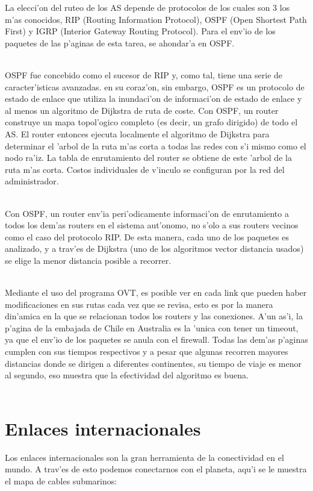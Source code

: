 \documentclass{article}
\begin{document}
La elecci'on del ruteo de los AS depende de protocolos de los cuales son 3 los m'as conocidos, RIP (Routing Information Protocol), OSPF (Open Shortest Path First) y IGRP (Interior Gateway Routing Protocol). Para el env'io de los paquetes de las p'aginas de esta tarea, se ahondar'a en OSPF.\\ \

OSPF fue concebido como el sucesor de RIP y, como tal, tiene una serie de caracter'isticas avanzadas. en su coraz'on, sin embargo, OSPF es un protocolo de estado de enlace que utiliza la inundaci'on de informaci'on de estado de enlace y al menos un algoritmo de Dijkstra de ruta de coste. Con OSPF, un router construye un mapa topol'ogico completo (es decir, un grafo dirigido) de todo el AS. El router entonces ejecuta localmente el algoritmo de Dijkstra para determinar el 'arbol de la ruta m'as corta a todas las redes con s'i mismo como el nodo ra'iz. La tabla de enrutamiento del router se obtiene de este 'arbol de la ruta m'as corta. Costos individuales de v'inculo se configuran por la red del administrador.\\ \

Con OSPF, un router env'ia peri'odicamente informaci'on de enrutamiento a todos los dem'as routers en el sistema aut'onomo, no s'olo a sus routers vecinos como el caso del protocolo RIP. De esta manera, cada uno de los paquetes es analizado, y a trav'es de Dijkstra (uno de los algoritmos vector distancia usados) se elige la menor distancia posible a recorrer.\\ \

Mediante el uso del programa OVT, es posible ver en cada link que pueden haber modificaciones en sus rutas cada vez que se revisa, esto es por la manera din'amica en la que se relacionan todos los routers y las conexiones. A'un as'i, la p'agina de la embajada de Chile en Australia es la 'unica con tener un timeout, ya que el env'io de los paquetes se anula con el firewall. Todas las dem'as p'aginas cumplen con sus tiempos respectivos y a pesar que algunas recorren mayores distancias donde se dirigen a diferentes continentes, su tiempo de viaje es menor al segundo, eso muestra que la efectividad del algoritmo es buena.\\ \
\section{Enlaces internacionales}
Los enlaces internacionales son la gran herramienta de la conectividad en el mundo. A trav'es de esto podemos conectarnos con el planeta, aqu'i se le muestra el mapa de cables submarinos:
\end{document}

